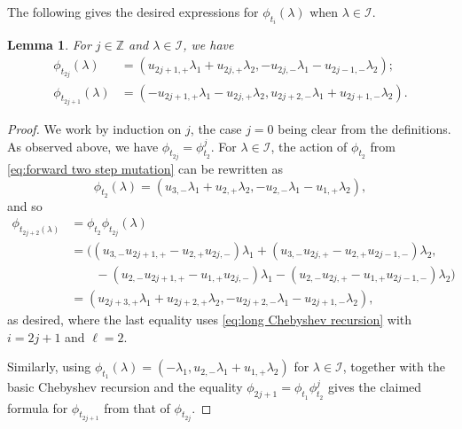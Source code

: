 \documentclass{amsart}
\newtheorem{lemma}[theorem]{Lemma}
\numberwithin{theorem}{section}
\newcommand{\cI}{\mathcal{I}}
\newcommand{\ZZ}{\mathbb{Z}}
\begin{document}
  The following gives the desired expressions for $\phi_{t_i}(\lambda)$ when $\lambda\in\cI$.
  \begin{lemma}
    \label{le:imaginary transformations}
    For $j\in\ZZ$ and $\lambda\in\cI$, we have
    \begin{align*}
      \phi_{t_{2j}}(\lambda)&=(u_{2j+1,+}\lambda_1+u_{2j,+}\lambda_2,-u_{2j,-}\lambda_1-u_{2j-1,-}\lambda_2);\\
      \phi_{t_{2j+1}}(\lambda)&=(-u_{2j+1,+}\lambda_1-u_{2j,+}\lambda_2,u_{2j+2,-}\lambda_1+u_{2j+1,-}\lambda_2).
    \end{align*}
  \end{lemma}
  \begin{proof}
    We work by induction on $j$, the case $j=0$ being clear from the definitions.
    As observed above, we have $\phi_{t_{2j}}=\phi_{t_2}^j$.
    For $\lambda\in\cI$, the action of $\phi_{t_2}$ from \eqref{eq:forward two step mutation} can be rewritten as
    \[\phi_{t_2}(\lambda)=(u_{3,-}\lambda_1+u_{2,+}\lambda_2,-u_{2,-}\lambda_1-u_{1,+}\lambda_2),\]
    and so
    \begin{align*}
      \phi_{t_{2j+2}(\lambda)}&=\phi_{t_2}\phi_{t_{2j}}(\lambda)\\
      &=\big( (u_{3,-}u_{2j+1,+}-u_{2,+}u_{2j,-})\lambda_1+(u_{3,-}u_{2j,+}-u_{2,+}u_{2j-1,-})\lambda_2,\\
      &\qquad -(u_{2,-}u_{2j+1,+}-u_{1,+}u_{2j,-})\lambda_1-(u_{2,-}u_{2j,+}-u_{1,+}u_{2j-1,-})\lambda_2 \big)\\
      &=(u_{2j+3,+}\lambda_1+u_{2j+2,+}\lambda_2, -u_{2j+2,-}\lambda_1-u_{2j+1,-}\lambda_2),
    \end{align*}
    as desired, where the last equality uses \eqref{eq:long Chebyshev recursion} with $i=2j+1$ and $\ell=2$.

    Similarly, using $\phi_{t_1}(\lambda)=(-\lambda_1,u_{2,-}\lambda_1+u_{1,+}\lambda_2)$ for $\lambda\in\cI$, together with the basic Chebyshev recursion and the equality $\phi_{2j+1}=\phi_{t_1}\phi_{t_2}^j$ gives the claimed formula for $\phi_{t_{2j+1}}$ from that of $\phi_{t_{2j}}$.
  \end{proof}
\end{document}
